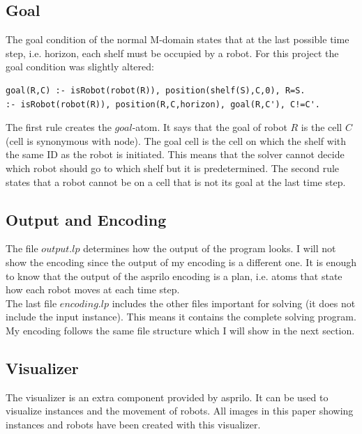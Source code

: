 \documentclass[runningheads]{llncs}
\begin{document}
\subsection{Goal}
The goal condition of the normal M-domain states that at the last possible time step, i.e. horizon, each shelf must be occupied by a robot. For this project the goal condition was slightly altered:
\begin{verbatim}
goal(R,C) :- isRobot(robot(R)), position(shelf(S),C,0), R=S.
:- isRobot(robot(R)), position(R,C,horizon), goal(R,C'), C!=C'.
\end{verbatim}
The first rule creates the $goal$-atom. It says that the goal of robot $R$ is the cell $C$ (cell is synonymous with node). The goal cell is the cell on which the shelf with the same ID as the robot is initiated. This means that the solver cannot decide which robot should go to which shelf but it is predetermined. The second rule states that a robot cannot be on a cell that is not its goal at the last time step.
\subsection{Output and Encoding}
The file $output.lp$ determines how the output of the program looks. I will not show the encoding since the output of my encoding is a different one. It is enough to know that the output of the asprilo encoding is a plan, i.e. atoms that state how each robot moves at each time step. \\
The last file $encoding.lp$ includes the other files important for solving (it does not include the input instance). This means it contains the complete solving program. My encoding follows the same file structure which I will show in the next section.
\subsection{Visualizer}
The visualizer is an extra component provided by asprilo. It can be used to visualize instances and the movement of robots. All images in this paper showing instances and robots have been created with this visualizer.
\end{document}
